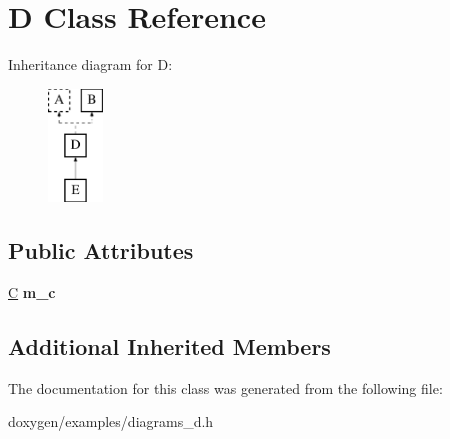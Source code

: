 \hypertarget{class_d}{}\section{D Class Reference}
\label{class_d}
Inheritance diagram for D\+:\begin{figure}[H]
\begin{center}
\leavevmode
\includegraphics[height=3.000000cm]{class_d}
\end{center}
\end{figure}
\subsection*{Public Attributes}
\begin{DoxyCompactItemize}
\item 
\mbox{\label{class_d_a9d877c7aa092f423f2a073f3c62fef9c}} 
\mbox{\hyperlink{class_c}{C}} {\bfseries m\+\_\+c}
\end{DoxyCompactItemize}
\subsection*{Additional Inherited Members}


The documentation for this class was generated from the following file\+:\begin{DoxyCompactItemize}
\item 
doxygen/examples/diagrams\+\_\+d.\+h\end{DoxyCompactItemize}
